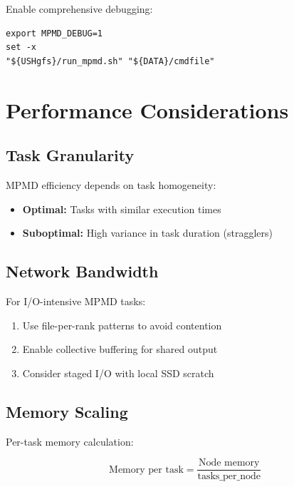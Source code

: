 \documentclass[11pt,a4paper,twoside]{article}
\begin{document}
Enable comprehensive debugging:

\begin{lstlisting}[style=bashstyle,caption={MPMD Debug Configuration},label={lst:debug}]
export MPMD_DEBUG=1
set -x
"${USHgfs}/run_mpmd.sh" "${DATA}/cmdfile"
\end{lstlisting}

\section{Performance Considerations}
\label{sec:performance}

\subsection{Task Granularity}

MPMD efficiency depends on task homogeneity:

\begin{itemize}
    \item \textbf{Optimal:} Tasks with similar execution times
    \item \textbf{Suboptimal:} High variance in task duration (stragglers)
\end{itemize}

\subsection{Network Bandwidth}

For I/O-intensive MPMD tasks:

\begin{enumerate}
    \item Use file-per-rank patterns to avoid contention
    \item Enable collective buffering for shared output
    \item Consider staged I/O with local SSD scratch
\end{enumerate}

\subsection{Memory Scaling}

Per-task memory calculation:

\begin{equation}
\text{Memory per task} = \frac{\text{Node memory}}{\text{tasks\_per\_node}}
\end{equation}
\end{document}
